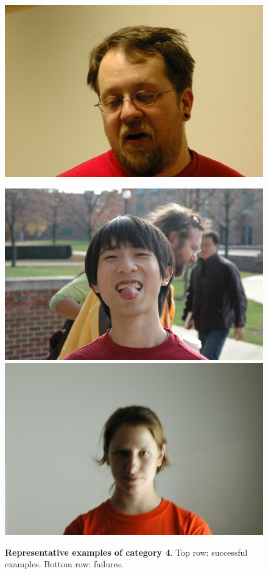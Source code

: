 \begin{figure}
\includegraphics[scale=0.35,clip=true]{figures_cvpr/examples/4/failure/DSC_1985.jpg} 
 \caption{{\bf Representative examples of category 4}. Top row: successful examples. Bottom row: failures.}\label{fig:examples4}
\vspace{0mm}
\centering
\includegraphics[scale=0.35,clip=true]{figures_cvpr/examples/5/success/DSC_1664.jpg} 
\includegraphics[scale=0.35,clip=true]{figures_cvpr/examples/5/success/DSC_1777.jpg} 

\end{figure}
